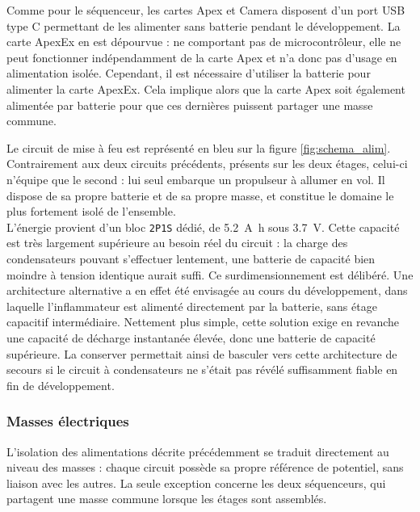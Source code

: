 Comme pour le séquenceur, les cartes Apex et Camera disposent d'un port \acrshort{USB} type C permettant de les alimenter sans
batterie pendant le développement. La carte ApexEx en est dépourvue : ne comportant pas de microcontrôleur, elle ne peut
fonctionner indépendamment de la carte Apex et n'a donc pas d'usage en alimentation isolée. Cependant, il est nécessaire d'utiliser
la batterie pour alimenter la carte ApexEx. Cela implique alors que la carte Apex soit également alimentée par batterie pour que
ces dernières puissent partager une masse commune.


Le circuit de mise à feu est représenté en bleu sur la figure \ref{fig:schema_alim}. Contrairement aux deux circuits
précédents, présents sur les deux étages, celui-ci n'équipe que le second : lui seul embarque un propulseur à allumer en vol.
Il dispose de sa propre batterie et de sa propre masse, et constitue le domaine le plus fortement isolé de l'ensemble.\\

L'énergie provient d'un bloc \verb|2P1S| dédié, de \SI{5.2}{\ampere\hour} sous \SI{3.7}{\volt}. Cette capacité est très
largement supérieure au besoin réel du circuit : la charge des condensateurs pouvant s'effectuer lentement, une batterie de
capacité bien moindre à tension identique aurait suffi. Ce surdimensionnement est délibéré. Une architecture alternative a en
effet été envisagée au cours du développement, dans laquelle l'inflammateur est alimenté directement par la batterie, sans
étage capacitif intermédiaire. Nettement plus simple, cette solution exige en revanche une capacité de décharge instantanée
élevée, donc une batterie de capacité supérieure. La conserver permettait ainsi de basculer vers cette architecture de
secours si le circuit à condensateurs ne s'était pas révélé suffisamment fiable en fin de développement.

\subsubsection{Masses électriques}

L'isolation des alimentations décrite précédemment se traduit directement au niveau des masses : chaque circuit possède sa propre
référence de potentiel, sans liaison avec les autres. La seule exception concerne les deux séquenceurs, qui partagent une masse
commune lorsque les étages sont assemblés.\\

